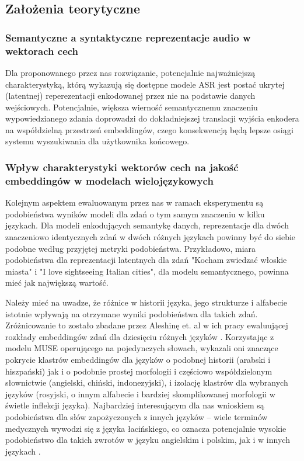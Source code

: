 \subsection{Założenia teorytyczne}
\subsubsection{Semantyczne a syntaktyczne reprezentacje audio w wektorach cech}
Dla proponowanego przez nas rozwiązanie, potencjalnie najważniejszą charakterystyką, którą wykazują się dostępne modele ASR jest postać ukrytej (latentnej) reperezentacji enkodowanej przez nie na podstawie danych wejściowych. Potencjalnie, większa wierność semantycznemu znaczeniu wypowiedzianego zdania doprowadzi do dokładniejszej translacji wyjścia enkodera na współdzielną przestrzeń embeddingów, czego konsekwencją będą lepsze osiągi systemu wyszukiwania dla użytkownika końcowego.
\subsubsection{Wpływ charakterystyki wektorów cech na jakość embeddingów w modelach wielojęzykowych}
Kolejnym aspektem ewaluowanym przez nas w ramach eksperymentu są podobieństwa wyników modeli dla zdań o tym samym znaczeniu w kilku językach. Dla modeli enkodujących semantykę danych, reprezentacje dla dwóch znaczeniowo identycznych zdań w dwóch różnych językach powinny być do siebie podobne według przyjętej metryki podobieństwa. Przykładowo, miara podobieństwa dla reprezentacji latentnych dla zdań "Kocham zwiedzać włoskie miasta" i "I love sightseeing Italian cities", dla modelu semantycznego, powinna mieć jak największą wartość.

Należy mieć na uwadze, że różnice w historii języka, jego strukturze i alfabecie istotnie wpływają na otrzymane wyniki podobieństwa dla takich zdań. Zróżnicowanie to zostało zbadane przez Aleshinę et. al w ich pracy ewaluującej rozkłady embeddingów zdań dla dziesięciu różnych języków \cite{multilanguageEmbeddingDifferences}. Korzystając z modelu MUSE \cite{museModel} operującego na pojedynczych słowach, wykazali oni znaczące pokrycie klastrów embeddingów dla języków o podobnej historii (arabski i hiszpański) jak i o podobnie prostej morfologii i częściowo współdzielonym słownictwie (angielski, chiński, indonezyjski), i izolację klastrów dla wybranych języków (rosyjski, o innym alfabecie i bardziej skomplikowanej morfologii w świetle inflekcji języka). Najbardziej interesującym dla nas wnioskiem są podobieństwa dla słów zapożyczonych z innych języków -- wiele terminów medycznych wywodzi się z języka łacińskiego, co oznacza potencjalnie wysokie podobieństwo dla takich zwrotów w języku angielskim i polskim, jak i w innych językach \cite{latinMedical}.

